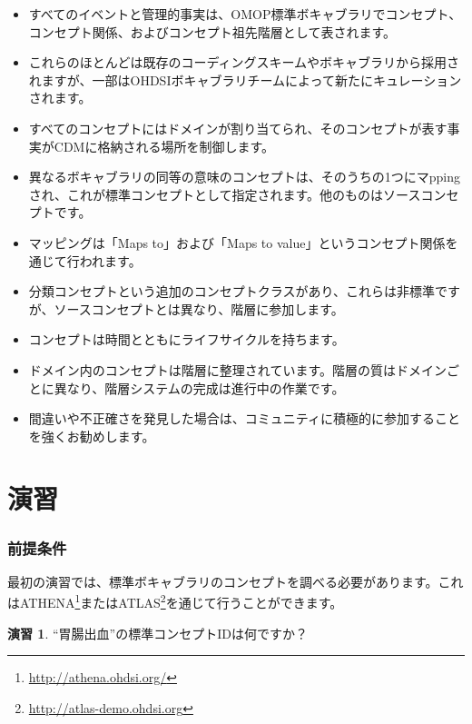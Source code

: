 \documentclass[
  11pt]{book}
\makeatletter
\providecommand{\tightlist}{%
  \setlength{\itemsep}{0pt}\setlength{\parskip}{0pt}}
\newenvironment{kframe}{%
\medskip{}
\setlength{\fboxsep}{.8em}
 \def\at@end@of@kframe{}%
 \ifinner\ifhmode%
  \def\at@end@of@kframe{\end{minipage}}%
  \begin{minipage}{\columnwidth}%
 \fi\fi%
 \def\FrameCommand##1{\hskip\@totalleftmargin \hskip-\fboxsep
 \colorbox{myShadeColor}{##1}\hskip-\fboxsep
     \hskip-\linewidth \hskip-\@totalleftmargin \hskip\columnwidth}%
 \MakeFramed {\advance\hsize-\width
   \@totalleftmargin\z@ \linewidth\hsize
   \@setminipage}}%
 {\par\unskip\endMakeFramed%
 \at@end@of@kframe}
\newenvironment{rmdblock}[1]
  {
  \begin{itemize}
  \renewcommand{\labelitemi}{
    \raisebox{-.7\height}[0pt][0pt]{
      {\setkeys{Gin}{width=3em,keepaspectratio}\texttt{[image: images/\#1]}}
    }
  }
  \setlength{\fboxsep}{1em}
  \begin{kframe}
  \item
  }
  {
  \end{kframe}
  \end{itemize}
  }
\newenvironment{rmdsummary}
  {\begin{rmdblock}{summary}}
  {\end{rmdblock}}
\theoremstyle{definition}
\theoremstyle{definition}
\theoremstyle{definition}
\newtheorem{exercise}{演習}[chapter]
\theoremstyle{definition}
\theoremstyle{remark}
\makeatother
\begin{document}
\begin{rmdsummary}
\begin{itemize}
\tightlist
\item
  すべてのイベントと管理的事実は、OMOP標準ボキャブラリでコンセプト、コンセプト関係、およびコンセプト祖先階層として表されます。
\item
  これらのほとんどは既存のコーディングスキームやボキャブラリから採用されますが、一部はOHDSIボキャブラリチームによって新たにキュレーションされます。
\item
  すべてのコンセプトにはドメインが割り当てられ、そのコンセプトが表す事実がCDMに格納される場所を制御します。
\item
  異なるボキャブラリの同等の意味のコンセプトは、そのうちの1つにマppingされ、これが標準コンセプトとして指定されます。他のものはソースコンセプトです。
\item
  マッピングは「Maps to」および「Maps to value」というコンセプト関係を通じて行われます。
\item
  分類コンセプトという追加のコンセプトクラスがあり、これらは非標準ですが、ソースコンセプトとは異なり、階層に参加します。
\item
  コンセプトは時間とともにライフサイクルを持ちます。
\item
  ドメイン内のコンセプトは階層に整理されています。階層の質はドメインごとに異なり、階層システムの完成は進行中の作業です。
\item
  間違いや不正確さを発見した場合は、コミュニティに積極的に参加することを強くお勧めします。
\end{itemize}
\end{rmdsummary}

\section{演習}\label{ux6f14ux7fd2}

\subsubsection*{前提条件}\label{ux524dux63d0ux6761ux4ef6-2}

最初の演習では、標準ボキャブラリのコンセプトを調べる必要があります。これはATHENA\footnote{\url{http://athena.ohdsi.org/}}またはATLAS\footnote{\url{http://atlas-demo.ohdsi.org}}を通じて行うことができます。

\begin{exercise}
\protect\hypertarget{exr:exerciseVocab1}{}\label{exr:exerciseVocab1}``胃腸出血''の標準コンセプトIDは何ですか？
\end{exercise}
\end{document}
